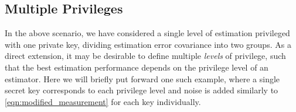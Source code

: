 \documentclass[letterpaper, 10 pt, conference]{IEEEtran}
\theoremstyle{definition}
\begin{document}
% 
% 

\subsection{Multiple Privileges}\label{subsec:mult_privileges}
In the above scenario, we have considered a single level of estimation privileged with one private key, dividing estimation error covariance into two groups. As a direct extension, it may be desirable to define multiple \textit{levels} of privilege, such that the best estimation performance depends on the privilege level of an estimator. Here we will briefly put forward one such example, where a single secret key corresponds to each privilege level and noise is added similarly to \eqref{eqn:modified_measurement} for each key individually.
\end{document}
